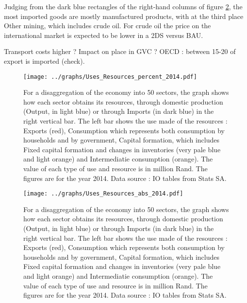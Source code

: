 \documentclass[12pt,english]{article}
\begin{document}
Judging from the dark blue rectangles of the right-hand columns of figure \ref{Uses_Resources_abs_2014}, the most imported goods are mostly manufactured products, with at the third place Other mining, which includes crude oil. For crude oil the price on the international market is expected to be lower in a 2DS versus BAU. 

Transport costs higher ? Impact on place in GVC ? OECD : between 15-20 of export is imported (check).


\begin{landscape}
	\thispagestyle{empty}
	\begin{figure}[!ht]
		\vspace{-30pt}\hspace{-36pt}\texttt{[image: ../graphs/Uses\_Resources\_percent\_2014.pdf]}
		\caption{\label{Uses_Resources_percent_2014}For a disaggregation of the economy into 50 sectors, the graph shows how each sector obtains its resources, through domestic production (Output, in light blue) or through Imports (in dark blue) in the right vertical bar. The left bar shows the use made of the resources : Exports (red), Consumption which represents both consumption by households and by government, Capital formation, which includes Fixed capital formation and changes in inventories (very pale blue and light orange) and Intermediatie consumption (orange). The value of each type of use and resource is in million Rand. The figures are for the year 2014. Data source : IO tables from Stats SA.}
	\end{figure}	
\end{landscape}


\begin{landscape}
	\thispagestyle{empty}
	\begin{figure}[!ht]
		\vspace{-30pt}\hspace{-36pt}\texttt{[image: ../graphs/Uses\_Resources\_abs\_2014.pdf]}
		\caption{\label{Uses_Resources_abs_2014}For a disaggregation of the economy into 50 sectors, the graph shows how each sector obtains its resources, through domestic production (Output, in light blue) or through Imports (in dark blue) in the right vertical bar. The left bar shows the use made of the resources : Exports (red), Consumption which represents both consumption by households and by government, Capital formation, which includes Fixed capital formation and changes in inventories (very pale blue and light orange) and Intermediatie consumption (orange). The value of each type of use and resource is in million Rand. The figures are for the year 2014. Data source : IO tables from Stats SA.}
	\end{figure}	
\end{landscape}
\end{document}
